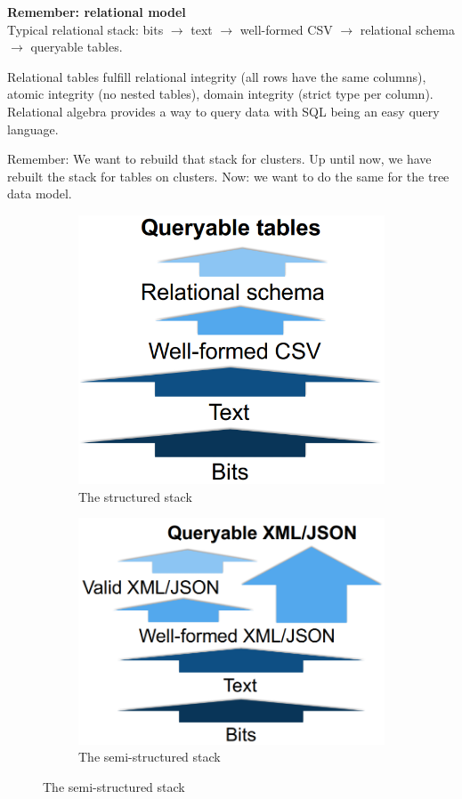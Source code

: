 \documentclass[11pt,oneside,a4paper]{article}
\begin{document}
\textbf{Remember: relational model}\\
Typical relational stack: bits $\rightarrow$ text $\rightarrow$ well-formed CSV $\rightarrow$ relational schema $\rightarrow$ queryable tables.

Relational tables fulfill relational integrity (all rows have the same columns), atomic integrity (no nested tables), domain integrity (strict type per column). Relational algebra provides a way to query data with SQL being an easy query language.

Remember: We want to rebuild that stack for clusters. Up until now, we have rebuilt the stack for tables on clusters. Now: we want to do the same for the tree data model.

\begin{figure}[hb!]
	\centering
	\begin{subfigure}[t]{.3\textwidth}
		\centering
		\includegraphics[width=0.6\linewidth]{figures/docstores_structured_stack}
		\caption{The structured stack}
	\end{subfigure}%
	\begin{subfigure}[t]{.3\textwidth}
		\centering
		\includegraphics[width=0.6\linewidth]{figures/docstores_semistructured_stack}
		\caption{The semi-structured stack}
	\end{subfigure}

\end{figure}
\end{document}
